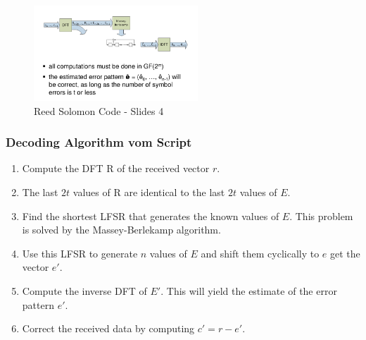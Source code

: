 \begin{figure}[H]
\centering
\includegraphics[width=0.55\textwidth]{figures/reedSolomonDecoding3.png}
\caption{Reed Solomon Code - Slides 4}
\end{figure}

\hypertarget{decoding-algorithm-vom-script}{%
\subsubsection{Decoding Algorithm vom
Script}\label{decoding-algorithm-vom-script}}

\begin{enumerate}
\tightlist
\item
  Compute the DFT R of the received vector $r$.
\item
  The last $2t$ values of R are identical to the last $2t$ values of $E$.
\item
  Find the shortest LFSR that generates the known values of $E$. This
  problem is solved by the Massey-Berlekamp algorithm.
\item
  Use this LFSR to generate $n$ values of $E$ and shift them cyclically to $e$
  get the vector $e'$.
\item
  Compute the inverse DFT of $E'$. This will yield the estimate of the
  error pattern $e'$.
\item
  Correct the received data by computing $c' = r - e'$.
\end{enumerate}

\clearpage
